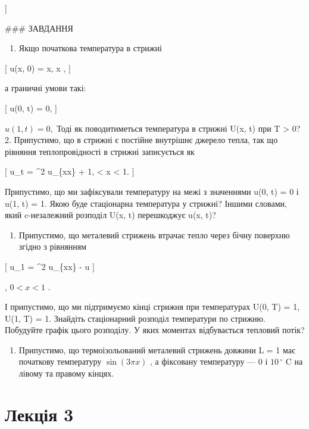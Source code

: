 \documentclass[
  ukrainian,
]{article}
\providecommand{\tightlist}{%
  \setlength{\itemsep}{0pt}\setlength{\parskip}{0pt}}
\begin{document}
{]}

\#\#\# ЗАВДАННЯ

\begin{enumerate}
\def\labelenumi{\arabic{enumi}.}
\tightlist
\item
  Якщо початкова температура в стрижні
\end{enumerate}

{[} u(x, 0) = \sin \pi x,  \leqslant x , {]}

а граничні умови такі:

{[} u(0, t) = 0, {]}

\(u(1, t) = 0,\) Тоді як поводитиметься температура в стрижні U(x, t)
при T \textgreater{} 0? 2. Припустимо, що в стрижні є постійне внутрішнє
джерело тепла, так що рівняння теплопровідності в стрижні записується як

{[} u\_t = \alpha\^{}2 u\_\{xx\} + 1,  \textless{} x \textless{}
1. {]}

Припустимо, що ми зафіксували температуру на межі з значеннями u(0, t) =
0 і u(1, t) = 1. Якою буде стаціонарна температура у стрижні? Іншими
словами, який c-незалежний розподіл U(x, t) перешкоджує u(x, t)?

\begin{enumerate}
\def\labelenumi{\arabic{enumi}.}
\setcounter{enumi}{2}
\tightlist
\item
  Припустимо, що металевий стрижень втрачає тепло через бічну поверхню
  згідно з рівнянням
\end{enumerate}

{[} u\_1 = \alpha\^{}2 u\_\{xx\} - \beta u {]}

, \(0 < x < 1\) .

І припустимо, що ми підтримуємо кінці стрижня при температурах U(0, T) =
1, U(1, T) = 1. Знайдіть стаціонарний розподіл температури по стрижню.
Побудуйте графік цього розподілу. У яких моментах відбувається тепловий
потік?

\begin{enumerate}
\def\labelenumi{\arabic{enumi}.}
\setcounter{enumi}{3}
\tightlist
\item
  Припустимо, що термоізольований металевий стрижень довжини L = 1 має
  початкову температуру \(\sin(3\pi x)\) , а фіксовану температуру --- 0
  і \(10\,^{\circ}\) C на лівому та правому кінцях.
\end{enumerate}

\section{Лекція 3}\label{ux43bux435ux43aux446ux456ux44f-3}
\end{document}
